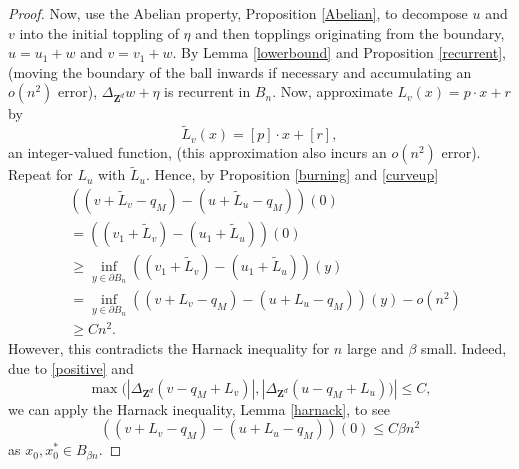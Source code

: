 \documentclass[12pt]{amsart}
\newcommand{\Z}{\mathbf{Z}}
\begin{document}
\begin{proof}
	Now, use the Abelian property, Proposition \ref{Abelian}, to decompose $u$ and $v$ into the initial toppling of $\eta$ and then topplings originating from the boundary, 
	$u = u_1 + w$ and $v = v_1 + w$. By Lemma \ref{lowerbound} and Proposition \ref{recurrent}, (moving the boundary of the ball inwards if necessary and accumulating an $o(n^2)$ error),
	$\Delta_{\Z^d} w + \eta$ is recurrent in $B_n$. Now, approximate $L_v(x) = p \cdot x +r$  by 
	\[
	\tilde{L}_v(x) = [p] \cdot x + [r],
	\]
	an integer-valued function, (this approximation also incurs an $o(n^2)$ error). Repeat for $L_u$ with $\tilde{L}_u$.  Hence, by Proposition \ref{burning} and \eqref{curveup}
	\begin{align*}
	&\left( (v + \tilde{L}_v - q_M) - (u + \tilde{L}_u - q_M) \right)(0)  \\
	&=   \left( (v_1 + \tilde{L}_v )- (u_1 + \tilde{L}_u) \right)(0)  \\
	&\geq \inf_{y \in \partial B_{n}}   \left( (v_1 + \tilde{L}_v )- (u_1 + \tilde{L}_u) \right)(y) \\
	&=  \inf_{y \in \partial B_{n}}   \left( (v + L_v - q_M)- (u + L_u - q_M) \right)(y)  - o(n^2) \\
	&\geq C n^2.
	\end{align*}
	However, this contradicts the Harnack inequality for $n$ large and $\beta$ small.  Indeed, due to \eqref{positive} and 
	\[
	\max(|\Delta_{\Z^d} (v - q_{M} + L_v)|, |\Delta_{\Z^d}  (u - q_{M} + L_u))| \leq C,
	\]
	we can apply the Harnack inequality, Lemma \ref{harnack}, to see
	\begin{equation} \label{small}
	\left( (v + L_v - q_M) - (u + L_u - q_M) \right)(0)  \leq C \beta n^2 
	\end{equation}
	as $x_0, x_0^* \in B_{\beta n}$. 




\end{proof}
\end{document}
